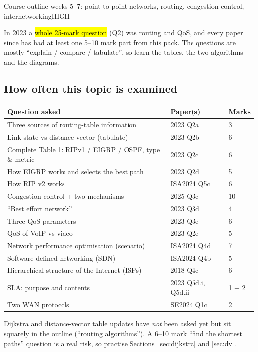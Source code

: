 \documentclass[10pt]{article}
\begin{document}
  {Course outline weeks 5--7: point-to-point networks, routing, congestion control, internetworking}{HIGH}

In 2023 a \hl{whole 25-mark question} (Q2) was routing and QoS, and every paper since has had at least one 5--10 mark part from this pack.
The questions are mostly ``explain / compare / tabulate'', so learn the tables, the two algorithms and the diagrams.

\subsection*{How often this topic is examined}
\begin{tabularx}{\linewidth}{@{}Xll@{}}
\toprule
\textbf{Question asked} & \textbf{Paper(s)} & \textbf{Marks}\\
\midrule
Three sources of routing-table information & 2023 Q2a & 3\\
Link-state vs distance-vector (tabulate) & 2023 Q2b & 6\\
Complete Table 1: RIPv1 / EIGRP / OSPF, type \& metric & 2023 Q2c & 6\\
How EIGRP works and selects the best path & 2023 Q2d & 5\\
How RIP v2 works & ISA2024 Q5c & 6\\
Congestion control + two mechanisms & 2025 Q3c & 10\\
``Best effort network'' & 2023 Q3d & 4\\
Three QoS parameters & 2023 Q3e & 6\\
QoS of VoIP vs video & 2023 Q2e & 5\\
Network performance optimisation (scenario) & ISA2024 Q4d & 7\\
Software-defined networking (SDN) & ISA2024 Q4b & 5\\
Hierarchical structure of the Internet (ISPs) & 2018 Q4c & 6\\
SLA: purpose and contents & 2023 Q5d.i, Q5d.ii & 1 + 2\\
Two WAN protocols & SE2024 Q1c & 2\\
\bottomrule
\end{tabularx}

\begin{examtip}
Dijkstra and distance-vector table updates have \emph{not} been asked yet but sit squarely in the outline (``routing algorithms''). A 6--10 mark ``find the shortest paths'' question is a real risk, so practise Sections~\ref{sec:dijkstra} and \ref{sec:dv}.
\end{examtip}
\end{document}
